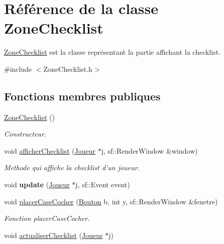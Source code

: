 \hypertarget{classZoneChecklist}{\section{\-Référence de la classe \-Zone\-Checklist}
\label{classZoneChecklist}
}


\hyperlink{classZoneChecklist}{\-Zone\-Checklist} est la classe représentant la partie affichant la checklist.  




{\ttfamily \#include $<$\-Zone\-Checklist.\-h$>$}

\subsection*{\-Fonctions membres publiques}
\begin{DoxyCompactItemize}
\item 
\hypertarget{classZoneChecklist_aee5e8750e39ef396f708fdfec48eca8c}{\hyperlink{classZoneChecklist_aee5e8750e39ef396f708fdfec48eca8c}{\-Zone\-Checklist} ()}\label{classZoneChecklist_aee5e8750e39ef396f708fdfec48eca8c}

\begin{DoxyCompactList}\small\item\em \-Constructeur. \end{DoxyCompactList}\item 
void \hyperlink{classZoneChecklist_a08e07cd3db2e76f1d33a0e3b26ec32eb}{afficher\-Checklist} (\hyperlink{classJoueur}{\-Joueur} $\ast$j, sf\-::\-Render\-Window \&window)
\begin{DoxyCompactList}\small\item\em \-Methode qui affiche la checklist d'un joueur. \end{DoxyCompactList}\item 
\hypertarget{classZoneChecklist_a5cb52a1aff880ce982ab002cafecce97}{void {\bfseries update} (\hyperlink{classJoueur}{\-Joueur} $\ast$j, sf\-::\-Event event)}\label{classZoneChecklist_a5cb52a1aff880ce982ab002cafecce97}

\item 
\hypertarget{classZoneChecklist_a31c52e893fe409f1dd2860eb9f28ce81}{void \hyperlink{classZoneChecklist_a31c52e893fe409f1dd2860eb9f28ce81}{placer\-Case\-Cocher} (\hyperlink{classBouton}{\-Bouton} b, int y, sf\-::\-Render\-Window \&fenetre)}\label{classZoneChecklist_a31c52e893fe409f1dd2860eb9f28ce81}

\begin{DoxyCompactList}\small\item\em \-Fonction placer\-Case\-Cocher. \end{DoxyCompactList}\item 
\hypertarget{classZoneChecklist_a2d22b4546f136a703da6fb0c6b8c0dcb}{void \hyperlink{classZoneChecklist_a2d22b4546f136a703da6fb0c6b8c0dcb}{actualiser\-Checklist} (\hyperlink{classJoueur}{\-Joueur} $\ast$j)}\label{classZoneChecklist_a2d22b4546f136a703da6fb0c6b8c0dcb}


\end{DoxyCompactItemize}
